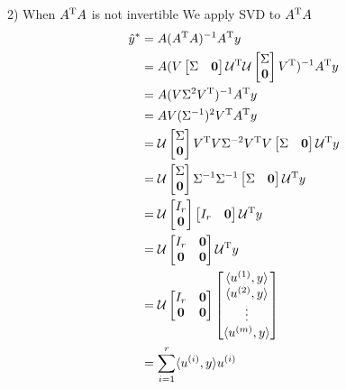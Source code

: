 2) When $A^{{\rm T}}A$ is not invertible
We apply SVD to $A^{{\rm T}} A$
\begin{align*}
\hat{y}^* &= A(A^{{\rm T}}A)^{-1}A^{{\rm T}}y\\
&= A(V
\begin{bmatrix}
\Sigma & \textbf{0}
\end{bmatrix}
\mathcal{U}^{{\rm T}}\mathcal{U}
\begin{bmatrix}
\Sigma \\
\textbf{0}
\end{bmatrix}
V^{{\rm T}})^{-1}A^{{\rm T}}y\\
&= A(V\Sigma^2V^{{\rm T}})^{-1}A^{{\rm T}}y\\
&= AV(\Sigma^{-1})^2V^{{\rm T}}A^{{\rm T}}y\\
&= \mathcal{U}
\begin{bmatrix}
\Sigma \\
\textbf{0}
\end{bmatrix}
V^{{\rm T}}V\Sigma^{-2}V^{{\rm T}}V
\begin{bmatrix}
\Sigma & \textbf{0}
\end{bmatrix}
\mathcal{U}^{{\rm T}}y\\
&= \mathcal{U}
\begin{bmatrix}
\Sigma \\
\textbf{0}
\end{bmatrix}
\Sigma^{-1}\Sigma^{-1}
\begin{bmatrix}
\Sigma & \textbf{0}
\end{bmatrix}
\mathcal{U}^{{\rm T}}y\\
&= \mathcal{U}
\begin{bmatrix}
I_r\\
\textbf{0}
\end{bmatrix}
\begin{bmatrix}
I_r & \textbf{0}
\end{bmatrix}
\mathcal{U}^{{\rm T}}y\\
&= \mathcal{U}
\begin{bmatrix}
I_r& \textbf{0}\\
\textbf{0} & \textbf{0}
\end{bmatrix}
\mathcal{U}^{{\rm T}}y\\
&= \mathcal{U}
\begin{bmatrix}
I_r& \textbf{0}\\
\textbf{0} &  \textbf{0}
\end{bmatrix}
\begin{bmatrix}
\langle u^{(1)}, y\rangle\\
\langle u^{(2)}, y\rangle \\
\vdots\\
\langle u^{(m)}, y\rangle
\end{bmatrix}\\
&= \sum^r_{i=1}\langle u^{(i)}, y\rangle u^{(i)}
\end{align*}



